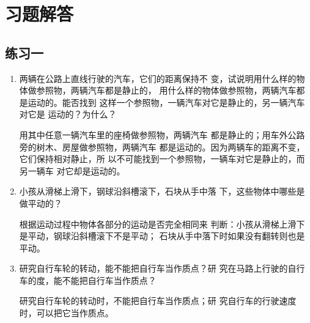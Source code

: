 \section{习题解答}
\subsection{练习一}
\begin{enumerate}
    \item 两辆在公路上直线行驶的汽车，它们的距离保持不
变，试说明用什么样的物体做参照物，两辆汽车都是静止的，
用什么样的物体做参照物，两辆汽车都是运动的。能否找到
这样一个参照物，一辆汽车对它是静止的，另一辆汽车对它是
运动的？为什么？


\begin{solution}
用其中任意一辆汽车里的座椅做参照物，两辆汽车
都是静止的；用车外公路旁的树木、房屋做参照物，两辆汽车
都是运动的。因为两辆车的距离不变，它们保持相对静止，所
以不可能找到一个参照物，一辆车对它是静止的，而另一辆车
对它却是运动的。
\end{solution}

\item 小孩从滑梯上滑下，钢球沿斜槽滚下，石块从手中落
下，这些物体中哪些是做平动的？

\begin{solution}
根据运动过程中物体各部分的运动是否完全相同来
判断：小孩从滑梯上滑下是平动，钢球沿斜槽滚下不是平动；
石块从手中落下时如果没有翻转则也是平动。
\end{solution}

\item 研究自行车轮的转动，能不能把自行车当作质点？研
究在马路上行驶的自行车的度，能不能把自行车当作质点？

\begin{solution}
    研究自行车轮的转动时，不能把自行车当作质点；研
    究自行车的行驶速度时，可以把它当作质点。
\end{solution}
\end{enumerate}


